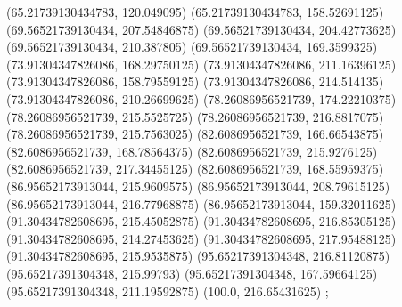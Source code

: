 {{{		(65.21739130434783, 120.049095)
		(65.21739130434783, 158.52691125)
		(69.56521739130434, 207.54846875)
		(69.56521739130434, 204.42773625)
		(69.56521739130434, 210.387805)
		(69.56521739130434, 169.3599325)
		(73.91304347826086, 168.29750125)
		(73.91304347826086, 211.16396125)
		(73.91304347826086, 158.79559125)
		(73.91304347826086, 214.514135)
		(73.91304347826086, 210.26699625)
		(78.26086956521739, 174.22210375)
		(78.26086956521739, 215.5525725)
		(78.26086956521739, 216.8817075)
		(78.26086956521739, 215.7563025)
		(82.6086956521739, 166.66543875)
		(82.6086956521739, 168.78564375)
		(82.6086956521739, 215.9276125)
		(82.6086956521739, 217.34455125)
		(82.6086956521739, 168.55959375)
		(86.95652173913044, 215.9609575)
		(86.95652173913044, 208.79615125)
		(86.95652173913044, 216.77968875)
		(86.95652173913044, 159.32011625)
		(91.30434782608695, 215.45052875)
		(91.30434782608695, 216.85305125)
		(91.30434782608695, 214.27453625)
		(91.30434782608695, 217.95488125)
		(91.30434782608695, 215.9535875)
		(95.65217391304348, 216.81120875)
		(95.65217391304348, 215.99793)
		(95.65217391304348, 167.59664125)
		(95.65217391304348, 211.19592875)
		(100.0, 216.65431625)
	};

}}
